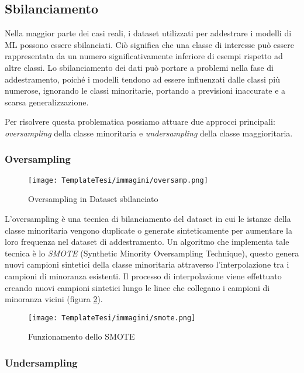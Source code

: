 \subsection{Sbilanciamento}
\begin{flushleft}
    
Nella maggior parte dei casi reali, i dataset utilizzati per addestrare i modelli di ML possono essere sbilanciati. Ciò significa che una classe di interesse può essere rappresentata da un numero significativamente inferiore di esempi rispetto ad altre classi. Lo sbilanciamento dei dati può portare a problemi nella fase di addestramento, poiché i modelli tendono ad essere influenzati dalle classi più numerose, ignorando le classi minoritarie, portando a previsioni inaccurate e a scarsa generalizzazione.

Per risolvere questa problematica possiamo attuare due approcci principali: \emph{oversampling} della classe minoritaria e \emph{undersampling} della classe maggioritaria. 

\subsubsection{Oversampling}
\begin{figure}[H]
    \centering
    \texttt{[image: TemplateTesi/immagini/oversamp.png]}
    \caption{Oversampling in Dataset sbilanciato \cite{ImmOverUnderSampling}}
    \label{fig:my_label}
\end{figure}
L'oversampling è una tecnica di bilanciamento del dataset in cui le istanze della classe minoritaria vengono duplicate o generate sinteticamente per aumentare la loro frequenza nel dataset di addestramento.
Un algoritmo che implementa tale tecnica è lo \emph{SMOTE} (Synthetic Minority Oversampling Technique), questo genera nuovi campioni sintetici della classe minoritaria attraverso l'interpolazione tra i campioni di minoranza esistenti.
Il processo di interpolazione viene effettuato creando nuovi campioni sintetici lungo le linee che collegano i campioni di minoranza vicini (figura \ref{fig:smote}).


\begin{figure}[H]
    \centering
    \texttt{[image: TemplateTesi/immagini/smote.png]}
    \caption{Funzionamento dello SMOTE}
    \label{fig:smote}
\end{figure}

\subsubsection{Undersampling}


\end{flushleft}
